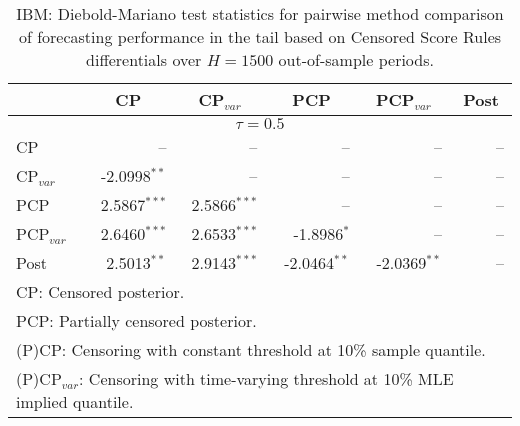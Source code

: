 { \renewcommand{\arraystretch}{1.2} 
\begin{table} 
\center 
\begin{tabular}{l | rrrrr} 
& \multicolumn{1}{c}{CP}& \multicolumn{1}{c}{CP$_{var}$}& \multicolumn{1}{c}{PCP}& \multicolumn{1}{c}{PCP$_{var}$}& \multicolumn{1}{c}{Post} \\ \hline 
\multicolumn{6}{c}{$\tau = 0.5$} \\ \hline 
CP &    --\phantom{$^{***}$} &    --\phantom{$^{***}$} &    --\phantom{$^{***}$} &    --\phantom{$^{***}$} &    --\phantom{$^{***}$}   \\ 
CP$_{var}$ & -2.0998$^{**}$\phantom{$^{*}$} &    --\phantom{$^{***}$} &    --\phantom{$^{***}$} &    --\phantom{$^{***}$} &    --\phantom{$^{***}$}   \\ 
PCP & 2.5867$^{***}$ & 2.5866$^{***}$ &    --\phantom{$^{***}$} &    --\phantom{$^{***}$} &    --\phantom{$^{***}$}   \\ 
PCP$_{var}$ & 2.6460$^{***}$ & 2.6533$^{***}$ & -1.8986$^{*}$\phantom{$^{**}$} &    --\phantom{$^{***}$} &    --\phantom{$^{***}$}   \\ 
Post & 2.5013$^{**}$\phantom{$^{*}$} & 2.9143$^{***}$ & -2.0464$^{**}$\phantom{$^{*}$} & -2.0369$^{**}$\phantom{$^{*}$} &    --\phantom{$^{***}$}   \\ 
\hline 
\multicolumn{6}{l}{\footnotesize{CP: Censored posterior.}}  \\ 
\multicolumn{6}{l}{\footnotesize{PCP: Partially censored posterior.}} \\ 
\multicolumn{6}{l}{\footnotesize{(P)CP: Censoring with constant threshold at 10\% sample quantile.}}  \\ 
\multicolumn{6}{l}{\footnotesize{(P)CP$_{var}$: Censoring with time-varying threshold at 10\% MLE implied quantile.}} \\ 
\end{tabular}
 \caption{IBM: Diebold-Mariano test statistics for  pairwise method comparison of forecasting performance in the tail based on  Censored Score Rules differentials over $H=1500$ out-of-sample periods. }
\label{tab:IBM_DM_0.5}  
\end{table}
}